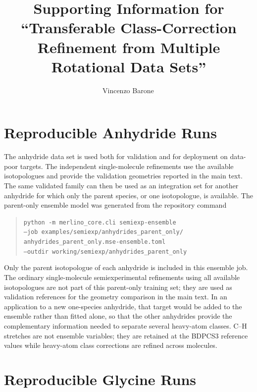 \documentclass[journal=jpclcd,manuscript=letter,etalmode=truncate,chaptertitle=true]{achemso}
\author{Vincenzo Barone\,\orcidlink{0000-0001-6420-4107}}
\affiliation{Consorzio Interuniversitario Nazionale per la Scienza e Tecnologia dei Materiali (INSTM), via G. Giusti 9, 50121 Firenze, Italy}
\title{Supporting Information for ``Transferable Class-Correction Refinement from Multiple Rotational Data Sets''}
\begin{document}
\section*{Reproducible Anhydride Runs}

The anhydride data set is used both for validation and for deployment on data-poor targets.  The independent single-molecule refinements use the available isotopologues and provide the validation geometries reported in the main text.  The same validated family can then be used as an integration set for another anhydride for which only the parent species, or one isotopologue, is available.  The parent-only ensemble model was generated from the repository command
\begin{quote}
\small
\texttt{python -m merlino\_core.cli semiexp-ensemble}\\
\texttt{--job examples/semiexp/anhydrides\_parent\_only/}\\
\texttt{anhydrides\_parent\_only.mse-ensemble.toml}\\
\texttt{--outdir working/semiexp/anhydrides\_parent\_only}
\end{quote}

Only the parent isotopologue of each anhydride is included in this ensemble job.\cite{morpheus_ensemble_working}
The ordinary single-molecule semiexperimental refinements using all available isotopologues are not part of this parent-only training set; they are used as validation references for the geometry comparison in the main text.  In an application to a new one-species anhydride, that target would be added to the ensemble rather than fitted alone, so that the other anhydrides provide the complementary information needed to separate several heavy-atom classes.
C--H stretches are not ensemble variables; they are retained at the BDPCS3 reference values while heavy-atom class corrections are refined across molecules.

\section*{Reproducible Glycine Runs}
\end{document}
